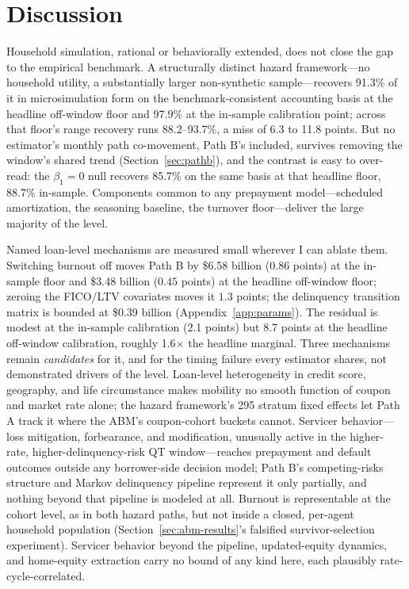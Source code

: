 \section{Discussion}\label{sec:discussion}

Household simulation, rational or behaviorally extended, does not close the gap to the empirical benchmark. A structurally distinct hazard framework---no household utility, a substantially larger non-synthetic sample---recovers 91.3\% of it in microsimulation form on the benchmark-consistent accounting basis at the headline off-window floor and 97.9\% at the in-sample calibration point; across that floor's range recovery runs 88.2--93.7\%, a miss of 6.3 to 11.8 points. But no estimator's monthly path co-movement, Path B's included, survives removing the window's shared trend (Section~\ref{sec:pathb}), and the contrast is easy to over-read: the $\beta_1 = 0$ null recovers 85.7\% on the same basis at that headline floor, 88.7\% in-sample. Components common to any prepayment model---scheduled amortization, the seasoning baseline, the turnover floor---deliver the large majority of the level.

Named loan-level mechanisms are measured small wherever I can ablate them. Switching burnout off moves Path B by \$6.58 billion ($0.86$ points) at the in-sample floor and \$3.48 billion ($0.45$ points) at the headline off-window floor; zeroing the FICO/LTV covariates moves it $1.3$ points; the delinquency transition matrix is bounded at \$0.39 billion (Appendix~\ref{app:params}). The residual is modest at the in-sample calibration (2.1 points) but 8.7 points at the headline off-window calibration, roughly 1.6$\times$ the headline marginal. Three mechanisms remain \emph{candidates} for it, and for the timing failure every estimator shares, not demonstrated drivers of the level. Loan-level heterogeneity in credit score, geography, and life circumstance makes mobility no smooth function of coupon and market rate alone; the hazard framework's 295 stratum fixed effects let Path A track it where the ABM's coupon-cohort buckets cannot. Servicer behavior---loss mitigation, forbearance, and modification, unusually active in the higher-rate, higher-delinquency-risk QT window---reaches prepayment and default outcomes outside any borrower-side decision model; Path B's competing-risks structure and Markov delinquency pipeline represent it only partially, and nothing beyond that pipeline is modeled at all. Burnout is representable at the cohort level, as in both hazard paths, but not inside a closed, per-agent household population (Section~\ref{sec:abm-results}'s falsified survivor-selection experiment). Servicer behavior beyond the pipeline, updated-equity dynamics, and home-equity extraction carry no bound of any kind here, each plausibly rate-cycle-correlated.

